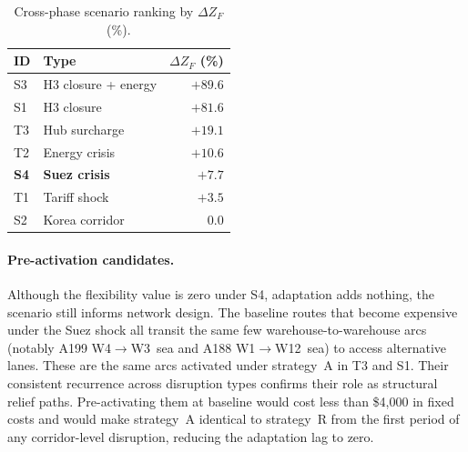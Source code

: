 \begin{table}[H]
\centering
\caption{Cross-phase scenario ranking by $\Delta Z_F$ (\%).}
\label{fig:scenario_ranking}
\small
\begin{tabular}{llr}
\toprule
\textbf{ID} & \textbf{Type} & \textbf{$\Delta Z_F$ (\%)} \\
\midrule
S3  & H3 closure + energy & $+89.6$ \\
S1  & H3 closure          & $+81.6$ \\
T3  & Hub surcharge       & $+19.1$ \\
T2  & Energy crisis       & $+10.6$ \\
\textbf{S4}  & \textbf{Suez crisis} & $\mathbf{+7.7}$ \\
T1  & Tariff shock        & $+3.5$  \\
S2  & Korea corridor      & $0.0$   \\
\bottomrule
\end{tabular}
\end{table}

\paragraph{Pre-activation candidates.}
Although the flexibility value is zero under S4, adaptation adds
nothing, the scenario still informs network design. The baseline
routes that become expensive under the Suez shock all transit the same
few warehouse-to-warehouse arcs (notably A199 W4$\rightarrow$W3~sea
and A188 W1$\rightarrow$W12~sea) to access alternative lanes. These
are the same arcs activated under strategy~A in T3 and S1. Their
consistent recurrence across disruption types confirms their role as
structural relief paths. Pre-activating them at baseline would cost
less than \$4{,}000 in fixed costs and would make strategy~A
identical to strategy~R from the first period of any
corridor-level disruption, reducing the adaptation lag to zero.